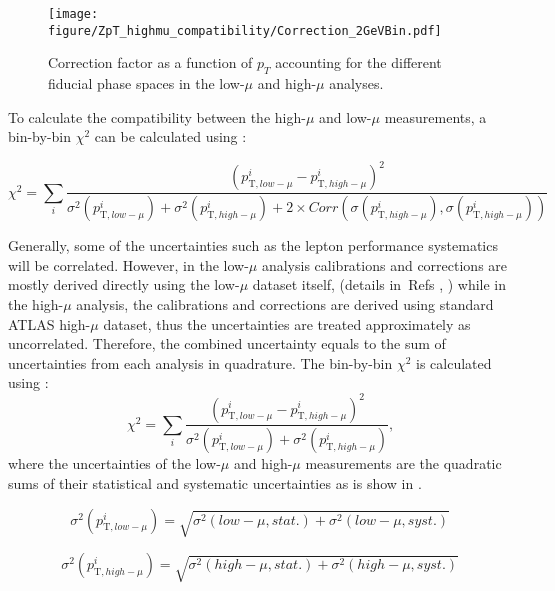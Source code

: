 \begin{figure}[h]
\centering
\texttt{[image: figure/ZpT\_highmu\_compatibility/Correction\_2GeVBin.pdf]}
\caption{Correction factor as a function of $p_{T}$ accounting for the different fiducial phase spaces in the low-$\mu$ and high-$\mu$ analyses.}
\label{f:Correction}
\end{figure}


To calculate the compatibility between the high-$\mu$ and low-$\mu$ measurements, a bin-by-bin $\chi^2$ can be calculated using \Eqn{\ref{eq:generalchi2}}:

\begin{equation}
\chi^2 = \sum_{i} \frac{(p_{\mathrm{T}, low-\mu}^{i} - p_{\mathrm{T}, high-\mu}^{i})^2}{\sigma^2 (p_{\mathrm{T}, low-\mu}^{i} )+\sigma^2 (p_{\mathrm{T},
high-\mu}^{i} )+2\times Corr\left(\sigma (p_{\mathrm{T}, high-\mu}^{i} ),\sigma (p_{\mathrm{T}, high-\mu}^{i} )\right)}
\label{eq:generalchi2}
\end{equation}

Generally, some of the uncertainties such as the lepton performance systematics will be correlated.
However, in the low-$\mu$ analysis calibrations and corrections are mostly derived directly using the low-$\mu$ dataset itself, (details in~Refs \cite{Xu:2657152}, \cite{Sydorenko:2657116}) while in the high-$\mu$ analysis, the calibrations and corrections are derived using standard ATLAS high-$\mu$ dataset, thus the uncertainties are treated approximately as uncorrelated.
Therefore, the combined uncertainty equals to the sum of uncertainties from each analysis in quadrature.
The bin-by-bin $\chi^2$ is calculated using \Eqn{\ref{eq:chi2highmu}}:
\begin{equation}
\chi^2 = \sum_{i} \frac{(p_{\mathrm{T}, low-\mu}^{i} - p_{\mathrm{T}, high-\mu}^{i})^2}{\sigma^2 (p_{\mathrm{T}, low-\mu}^{i} )+\sigma^2 (p_{\mathrm{T}, high-\mu}^{i} )} \textrm{,}
\label{eq:chi2highmu}
\end{equation}
where the uncertainties of the low-$\mu$ and high-$\mu$ measurements are the quadratic sums of their statistical and systematic uncertainties as is show in .

\begin{equation}
\sigma^2 (p_{\mathrm{T}, low-\mu}^{i}) = \sqrt{ \sigma^2(low-\mu, stat.) + \sigma^2(low-\mu, syst.) }
\label{eq:sigmalowmu}
\end{equation}

\begin{equation}
\sigma^2 (p_{\mathrm{T}, high-\mu}^{i}) = \sqrt{ \sigma^2(high-\mu, stat.) + \sigma^2(high-\mu, syst.) }
\label{eq:sigmahighmu}
\end{equation}

